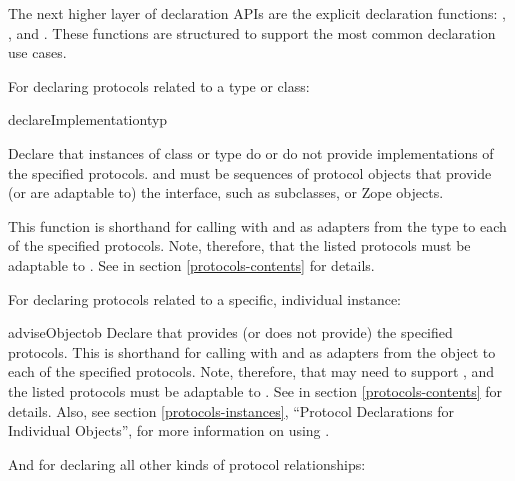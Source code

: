 \begin{verbatim%
}
\begin{verbatim%
}
\begin{verbatim%
}
\begin{verbatim%
}
The next higher layer of declaration APIs are the explicit declaration
functions: , , and
.  These functions are structured to support the most
common declaration use cases.

For declaring protocols related to a type or class:

\begin{funcdesc}{declareImplementation}{typ
 }

Declare that instances of class or type  do or do not provide
implementations of the specified protocols.   and
 must be sequences of protocol objects that
provide (or are adaptable to) the  interface,
such as  subclasses, or Zope 
objects.

This function is shorthand for calling 
with  and  as adapters
from the type to each of the specified protocols.  Note, therefore, that the
listed protocols must be adaptable to .  See
 in section \ref{protocols-contents} for
details.
\end{funcdesc}


For declaring protocols related to a specific, individual instance:

\begin{funcdesc}{adviseObject}{ob
 }
Declare that  provides (or does not provide) the specified protocols.
This is shorthand for calling 
with  and  as adapters
from the object to each of the specified protocols.  Note, therefore, that
 may need to support , and the listed protocols
must be adaptable to .  See
 in section \ref{protocols-contents} for
details.  Also, see section \ref{protocols-instances}, ``Protocol Declarations
for Individual Objects'', for more information on using
.
\end{funcdesc}





And for declaring all other kinds of protocol relationships:


\end{verbatim%
}
\end{verbatim%
}
\end{verbatim%
}
\end{verbatim%
}
